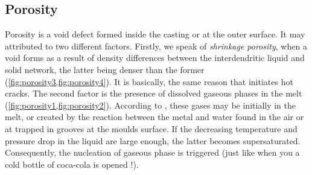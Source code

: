\subsection*{Porosity}
Porosity is a void defect formed inside the casting or at the outer surface. It may attributed to two different factors.
Firstly, we speak of \emph{shrinkage porosity}, when a void forms as a result of density differences between the interdendritic liquid and solid
network, the latter being denser than the former (\cref{fig:porosity3,fig:porosity4}). It is basically, the same reason that initiates hot cracks. 
The second factor is the presence of dissolved gaseous phases in the melt (\cref{fig:porosity1,fig:porosity2}). According to \citet{dantzig_solidification_2009}, these gases may be initially in the melt, or created by the reaction between the metal and water found in the air or at trapped in grooves at the moulds surface. If the decreasing temperature and pressure drop in the liquid are large enough, the latter becomes supersaturated. Consequently, the nucleation of gaseous phase is triggered (just like when you a cold bottle of coca-cola is opened !).

